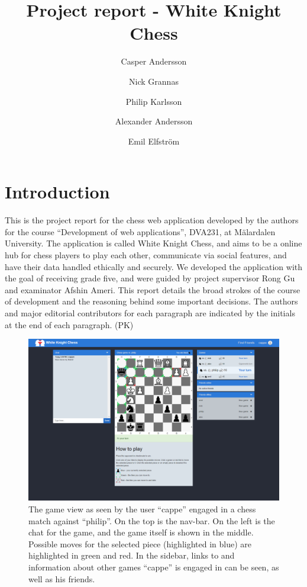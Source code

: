 \documentclass[acmlarge, review=false, screen=true]{acmart}
\begin{document}
\title{Project report - White Knight Chess}

\author{Casper Andersson}
\author{Nick Grannas}
\author{Philip Karlsson}
\author{Alexander Andersson}
\author{Emil Elfström}



\maketitle

\section{Introduction}
This is the project report for the chess web application developed by the authors for the course “Development of web applications”, DVA231, at Mälardalen University. The application is called White Knight Chess, and aims to be a online hub for chess players to play each other, communicate via social features, and have their data handled ethically and securely. We developed the application with the goal of receiving grade five, and were guided by project supervisor Rong Gu and examinator Afshin Ameri. This report details the broad strokes of the course of development and the reasoning behind some important decisions. The authors and major editorial contributors for each paragraph are indicated by the initials at the end of each paragraph. (PK)

\begin{figure}
  \includegraphics[width=\textwidth]{images/screenshot-of-WKC.png}
  \caption{The game view as seen by the user “cappe” engaged in a chess match against “philip”. On the top is the nav-bar. On the left is the chat for the game, and the game itself is shown in the middle. Possible moves for the selected piece (highlighted in blue) are highlighted in green and red. In the sidebar, links to and information about other games “cappe” is engaged in can be seen, as well as his friends.
  }
  \label{fig:game-view}
\end{figure}
\end{document}

